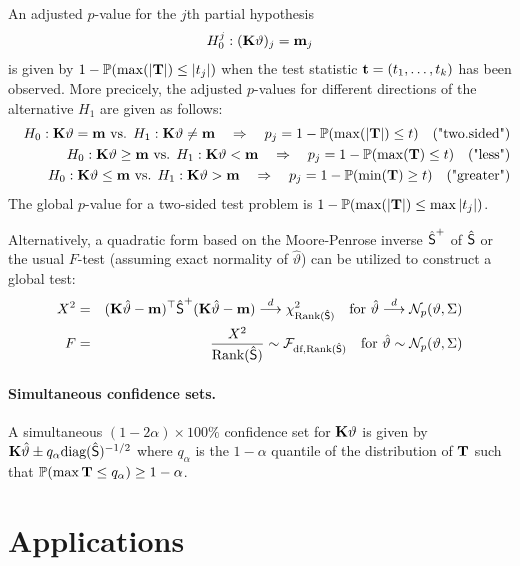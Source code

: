 \documentclass[12pt]{article}
\begin{document}
An adjusted $p$-value for the $j$th partial hypothesis 
\begin{eqnarray*}
H_0^j: (\K \vartheta)_j = \m_j
\end{eqnarray*}
is given by $1 - \Prob(\max(|\T|) \le |t_j|)$ when the test statistic 
$\tt  = (t_1, \dots, t_k)$
has been observed. More precicely, the adjusted $p$-values for different
directions of the alternative $H_1$ are given as follows:
\begin{eqnarray*}
& & H_0: \K \vartheta = \m \text{ vs. } H_1: \K \vartheta \not = \m \quad \Rightarrow \quad p_j  =  1 - \Prob(\max(|\T|) \le t) \quad \text{("two.sided")} \\
& & H_0: \K \vartheta \ge \m \text{ vs. } H_1: \K \vartheta < \m  \quad \Rightarrow \quad p_j  =  1 - \Prob(\max(\T) \le t) \quad \text{("less")} \\
& & H_0: \K \vartheta \le \m \text{ vs. } H_1: \K \vartheta > \m \quad \Rightarrow \quad p_j  =  1 - \Prob(\min(\T) \ge t) \quad \text{("greater")} \\
\end{eqnarray*}
The global $p$-value for a two-sided test problem is $1 - \Prob(\max(|\T|) \le \max|t_j|)$.

Alternatively, a quadratic form based on the Moore-Penrose inverse $\hat{\S}^+$ of 
$\hat{\S}$ or the usual $F$-test (assuming exact normality of $\hat{\vartheta}$) 
can be utilized to construct a global test:
\begin{eqnarray*}
X^2 & = & (\K \hat{\vartheta} - \m)^\top \hat{\S}^+ (\K \hat{\vartheta} - \m) \cL \chi^2_{\Rg(\hat{\S})} 
\quad \text{for } \hat{\vartheta} \cL \N_p(\vartheta, \Sigma) \\
F & = &  \frac{X^2}{\Rg(\hat{\S})} \sim \F_{\text{df}, \Rg(\hat{\S})} \quad \text{for } \hat{\vartheta} \sim \N_p(\vartheta, \Sigma)
\end{eqnarray*}

\paragraph{Simultaneous confidence sets.}

A simultaneous $(1 - 2\alpha) \times 100\%$ 
confidence set for $\K \vartheta$ is given by 
$\K \hat{\vartheta} \pm q_\alpha \text{diag}(\hat{\S})^{-1/2}$
where $q_\alpha$ is the $1 - \alpha$ 
quantile of the distribution of $\T$ 
such that $\Prob(\max{\T} \le q_\alpha) \ge 1 - \alpha$.

\section{Applications} \label{applications}
\end{document}
